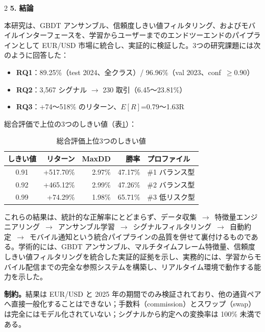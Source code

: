 \begin{multicols*}{2}
\noindent\textbf{5. 結論}

本研究は、GBDT アンサンブル、信頼度しきい値フィルタリング、およびモバイルインターフェースを、学習からユーザーまでのエンドツーエンドのパイプラインとして EUR/USD 市場に統合し、実証的に検証した。3つの研究課題には次のように回答した：

\begin{itemize}\setlength\itemsep{0pt}\small
    \item \textbf{RQ1}：89.25\%（test 2024、全クラス）/ 96.96\%（val 2023、conf~$\geq 0.90$）
    \item \textbf{RQ2}：3{,}567 シグナル $\to$ 230 取引（6.45〜23.81\%）
    \item \textbf{RQ3}：+74〜518\% のリターン、$E[R]$=0.79〜1.63R
\end{itemize}

総合評価で上位の3つのしきい値（表\ref{tab:tovjp_rq3_summary}）：

\begin{table}[H]
\centering
\caption{総合評価上位3つのしきい値}
\label{tab:tovjp_rq3_summary}
\scriptsize
\renewcommand{\arraystretch}{1.12}
\setlength{\tabcolsep}{2.5pt}
\begin{tabular}{|c|r|r|r|l|}
\hline
しきい値 & リターン & MaxDD & 勝率 & プロファイル \\ \hline
0.91 & +517.70\% & 2.97\% & 47.17\% & \#1 バランス型 \\ \hline
0.92 & +465.12\% & 2.99\% & 47.26\% & \#2 バランス型 \\ \hline
0.99 & +74.29\%  & 1.98\% & 65.71\% & \#3 低リスク型 \\ \hline
\end{tabular}
\end{table}

これらの結果は、統計的な正解率にとどまらず、データ収集~$\to$~特徴量エンジニアリング~$\to$~アンサンブル学習~$\to$~シグナルフィルタリング~$\to$~自動約定~$\to$~モバイル通知という統合パイプラインの品質を併せて裏付けるものである。学術的には、GBDT アンサンブル、マルチタイムフレーム特徴量、信頼度しきい値フィルタリングを統合した実証的証拠を示し、実務的には、学習からモバイル配信までの完全な参照システムを構築し、リアルタイム環境で動作する能力を示した。

\textbf{制約。}結果は EUR/USD と 2025 年の期間でのみ検証されており、他の通貨ペアへ直接一般化することはできない；手数料（commission）とスワップ（swap）は完全にはモデル化されていない；シグナルから約定への変換率は 100\% 未満である。


\end{multicols*}
